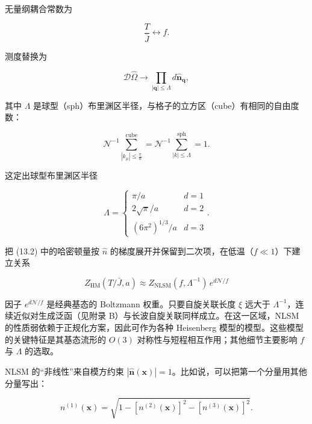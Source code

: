 无量纲耦合常数为

\begin{equation*}
\frac {T}{\overline {J}} \leftrightarrow f.
\tag{13.5}
\end{equation*}

测度替换为

\begin{equation*}
\mathcal {D} \hat {\Omega} \rightarrow \prod_{| \mathbf {q} | \leq \Lambda} d \hat {\mathbf {n}} _ {\mathbf {q}} ,
\tag{13.6}
\end{equation*}

其中 $\Lambda$ 是球型（sph）布里渊区半径，与格子的立方区（cube）有相同的自由度数：

\begin{equation*}
\mathcal {N} ^ {- 1} \sum_{| k _ {\mu} | \leq \frac {\pi}{a}} ^ {\mathrm{cube}} = \mathcal {N} ^ {- 1} \sum_{| k | \leq \Lambda} ^ {\mathrm{sph}} = 1.
\tag{13.7}
\end{equation*}

这定出球型布里渊区半径

\begin{equation*}
\Lambda = \left\{ \begin{array}{ll} \pi / a & d {=} 1 \\ 2 \sqrt {\pi} / a & d {=} 2 \\ ( 6 \pi^ {2} ) ^ {1/3} / a & d {=} 3 \end{array} \right..
\tag{13.8}
\end{equation*}

把 (13.2) 中的哈密顿量按 $\hat{n}$ 的梯度展开并保留到二次项，在低温（$f \ll 1$）下建立关系

\begin{equation*}
Z_{\mathrm{HM}} ( T / \bar {J}, a ) \approx Z_{\mathrm{NLSM}} ( f, \Lambda^ {- 1} ) \, e ^ {d \mathcal {N} / f}
\tag{13.9}
\end{equation*}

因子 $e^{d\mathcal{N}/f}$ 是经典基态的 Boltzmann 权重。只要自旋关联长度 $\xi$ 远大于 $\Lambda^{-1}$，连续近似对生成泛函（见附录 B）与长波自旋关联同样成立。在这一区域，NLSM 的性质弱依赖于正规化方案，因此可作为各种 Heisenberg 模型的模型。这些模型的关键特征是其基态流形的 $O(3)$ 对称性与短程相互作用；其他细节主要影响 $f$ 与 $\Lambda$ 的选取。

NLSM 的“非线性”来自模方约束 $|\hat{\mathbf{n}}(\mathbf{x})|=1$。比如说，可以把第一个分量用其他分量写出：

\begin{equation*}
n ^ {(1)} ( \mathbf {x} ) = \sqrt {1 - \left[ n ^ {(2)} ( \mathbf {x} ) \right] ^ {2} - \left[ n ^ {(3)} ( \mathbf {x} ) \right] ^ {2}}.
\tag{13.10}
\end{equation*}

